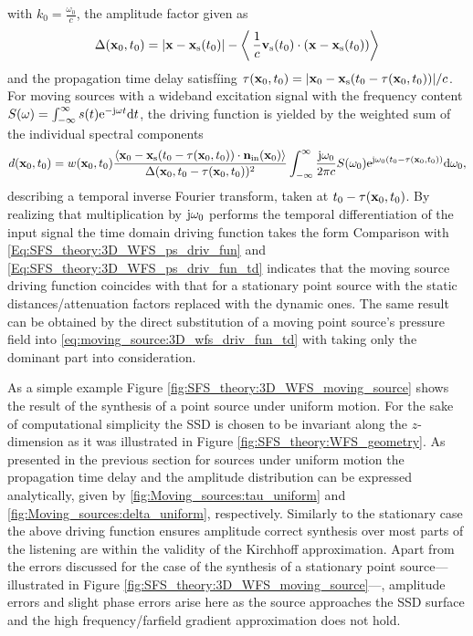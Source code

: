 with $k_0 = \frac{\omega_0}{c}$, the amplitude factor given as
\begin{equation}
\Delta( \mathbf{x}_0,t_0 ) = |\mathbf{x} - \mathbf{x}_{\mathrm{s}}(t_0)| - \left<\, \frac{1}{c}\mathbf{v}_{\mathrm{s}}(t_0) \cdot (\mathbf{x} - \mathbf{x}_{\mathrm{s}}(t_0)) \right> 
\end{equation}
and the propagation time delay satisfíing $\tau(\mathbf{x}_0,t_0) = | \mathbf{x}_0 - \mathbf{x}_{\mathrm{s}}( t_0 - \tau(\mathbf{x}_0,t_0)) | / c$.
For moving sources with a wideband excitation signal with the frequency content $S(\omega) = \int_{-\infty}^{\infty} s(t) \mathrm{e}^{-\mathrm{j} \omega t} \mathrm{d} t$, the driving function is yielded by the weighted sum of the individual spectral components
\begin{equation}
d(\mathbf{x}_0,t_0) =  w(\mathbf{x}_0,t_0)  
\frac{\left< \mathbf{x}_0 -\mathbf{x}_{\mathrm{s}}(t_0-\tau(\mathbf{x}_0,t_0)) \cdot \mathbf{n}_{\mathrm{in}}(\mathbf{x}_0) \right>}{\Delta(\mathbf{x}_0,t_0-\tau(\mathbf{x}_0,t_0))^2}
\int_{-\infty}^{\infty} \frac{\mathrm{j} \omega_0}{2\pi c} S(\omega_0 )\mathrm{e}^{\mathrm{j} \omega_0\left( t_0 - \tau( \mathbf{x}_0,t_0 )\right)} \mathrm{d} \omega_0,
\end{equation}
describing a temporal inverse Fourier transform, taken at $t_0 - \tau( \mathbf{x}_0,t_0 )$.
By realizing that multiplication by $\mathrm{j} \omega_0$ performs the temporal differentiation of the input signal the time domain driving function takes the form
Comparison with \eqref{Eq:SFS_theory:3D_WFS_ps_driv_fun} and \eqref{Eq:SFS_theory:3D_WFS_ps_driv_fun_td} indicates that the moving source driving function coincides with that for a stationary point source with the static distances/attenuation factors replaced with the dynamic ones.
The same result can be obtained by the direct substitution of a moving point source's pressure field into \eqref{eq:moving_source:3D_wfs_driv_fun_td} with taking only the dominant part into consideration.

As a simple example Figure \ref{fig:SFS_theory:3D_WFS_moving_source} shows the result of the synthesis of a point source under uniform motion.
For the sake of computational simplicity the SSD is chosen to be invariant along the $z$-dimension as it was illustrated in Figure \ref{fig:SFS_theory:WFS_geometry}.
As presented in the previous section for sources under uniform motion the propagation time delay and the amplitude distribution can be expressed analytically, given by \eqref{fig:Moving_sources:tau_uniform} and \eqref{fig:Moving_sources:delta_uniform}, respectively.
Similarly to the stationary case the above driving function ensures amplitude correct synthesis over most parts of the listening are within the validity of the Kirchhoff approximation.
Apart from the errors discussed for the case of the synthesis of a stationary point source---illustrated in Figure \ref{fig:SFS_theory:3D_WFS_moving_source}---, amplitude errors and slight phase errors arise here as the source approaches the SSD surface and the high frequency/farfield gradient approximation does not hold.

